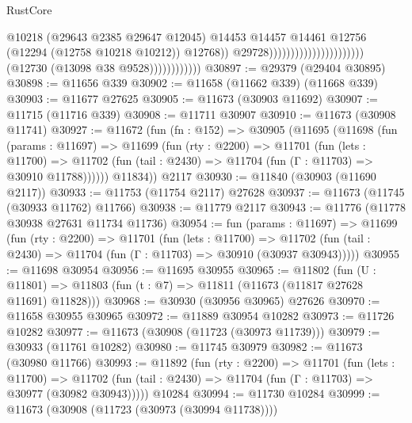 \begin{lexlean}{RustCore}
\begin{coremodule}
                                                                        @10218
                                                                        (@29643 @2385 @29647 @12045)
                                                                        @14453
                                                                        @14457
                                                                        @14461
                                                                        @12756
                                                                        (@12294
                                                                          (@12758 @10218 @10212))
                                                                        @12768))
                                                                    @29728))))))))))))))))))))))
                        (@12730 (@13098 @38 @9528))))))))))))
@30897 := @29379 (@29404 @30895)
@30898 := @11656 @339
@30902 := @11658 (@11662 @339) (@11668 @339)
@30903 := @11677 @27625
@30905 := @11673 (@30903 @11692)
@30907 := @11715 (@11716 @339)
@30908 := @11711 @30907
@30910 := @11673 (@30908 @11741)
@30927 := @11672
    (fun (fn : @152) =>
    @30905
      (@11695
        (@11698
          (fun (params : @11697) =>
          @11699
            (fun (rty : @2200) =>
            @11701
              (fun (lets : @11700) =>
              @11702 (fun (tail : @2430) => @11704 (fun (Γ : @11703) => @30910 @11788))))))
        @11834))
    @2117
@30930 := @11840 (@30903 (@11690 @2117))
@30933 := @11753 (@11754 @2117) @27628
@30937 := @11673 (@11745 (@30933 @11762) @11766)
@30938 := @11779 @2117
@30943 := @11776 (@11778 @30938 @27631 @11734 @11736)
@30954 := fun (params : @11697) =>
  @11699
    (fun (rty : @2200) =>
    @11701
      (fun (lets : @11700) =>
      @11702 (fun (tail : @2430) => @11704 (fun (Γ : @11703) => @30910 (@30937 @30943)))))
@30955 := @11698 @30954
@30956 := @11695 @30955
@30965 := @11802
    (fun (U : @11801) => @11803 (fun (t : @7) => @11811 (@11673 (@11817 @27628 @11691) @11828)))
@30968 := @30930 (@30956 @30965) @27626
@30970 := @11658 @30955 @30965
@30972 := @11889 @30954 @10282
@30973 := @11726 @10282
@30977 := @11673 (@30908 (@11723 (@30973 @11739)))
@30979 := @30933 (@11761 @10282)
@30980 := @11745 @30979
@30982 := @11673 (@30980 @11766)
@30993 := @11892
    (fun (rty : @2200) =>
    @11701
      (fun (lets : @11700) =>
      @11702 (fun (tail : @2430) => @11704 (fun (Γ : @11703) => @30977 (@30982 @30943)))))
    @10284
@30994 := @11730 @10284
@30999 := @11673 (@30908 (@11723 (@30973 (@30994 @11738))))

\end{coremodule}
\end{lexlean}
